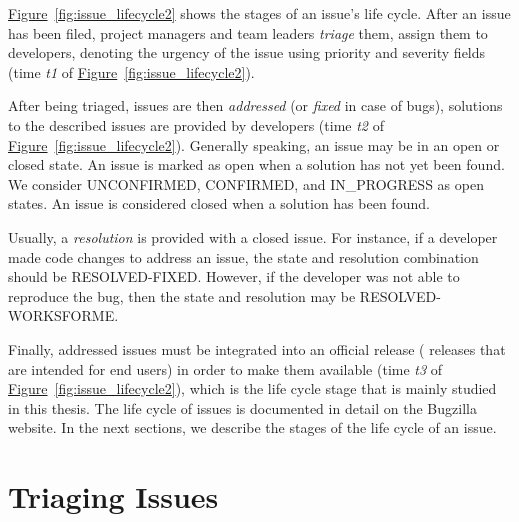 \hyperref[fig:issue_lifecycle2]{Figure}~\ref{fig:issue_lifecycle2} shows the
stages of an issue's life cycle. After an issue has been filed, project managers
and team leaders {\em triage} them, \ie assign them to developers, denoting the
urgency of the issue using priority and severity fields~\cite{Anvik2006} (time
{\em t1} of \hyperref[fig:issue_lifecycle2]{Figure}~\ref{fig:issue_lifecycle2}). 

After being triaged, issues are then {\em addressed} (or {\em fixed} in case of
bugs), \ie solutions to the described issues are provided by developers (time
{\em t2} of \hyperref[fig:issue_lifecycle2]{Figure}~\ref{fig:issue_lifecycle2}).  Generally speaking, an issue may be in an open or closed state.  An
issue is marked as open when a solution has not yet been found. We consider
UNCONFIRMED, CONFIRMED, and IN\_PROGRESS as open states. An issue is considered
closed when a solution has been found. 

Usually, a \textit{resolution} is provided with a closed issue. For instance, if
a developer made code changes to address an issue, the state and resolution
combination should be RESOLVED-FIXED.  However, if the developer was not able to
reproduce the bug, then the state and resolution may be
RESOLVED-WORKSFORME.

Finally, addressed issues must be integrated into an official release (\ie
releases that are intended for end users) in order to make them available (time
{\em t3} of \hyperref[fig:issue_lifecycle2]{Figure}~\ref{fig:issue_lifecycle2}),
which is the life cycle stage that is mainly studied in this thesis.  The life
cycle of issues is documented in detail on the Bugzilla
website.
In the next sections, we describe the stages of the life cycle of an issue.


\section{Triaging Issues}

